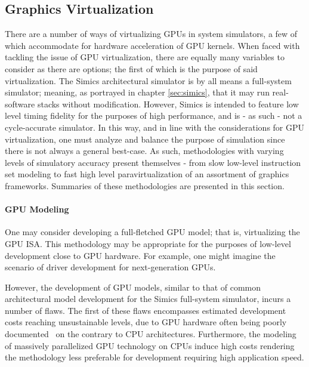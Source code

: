 \subsection{Graphics Virtualization}
\label{sec:backgroundandrelatedwork_graphicsvirtualization}
There are a number of ways of virtualizing GPUs in system simulators, a few of which accommodate for hardware acceleration of GPU kernels.
When faced with tackling the issue of GPU virtualization, there are equally many variables to consider as there are options; the first of which is the purpose of said virtualization.
The Simics architectural simulator is by all means a full-system simulator; meaning, as portrayed in chapter \ref{sec:simics}, that it may run real-software stacks without modification.
However, Simics is intended to feature low level timing fidelity for the purposes of high performance, and is - as such - not a cycle-accurate simulator.
In this way, and in line with the considerations for GPU virtualization, one must analyze and balance the purpose of simulation since there is not always a general best-case.
As such, methodologies with varying levels of simulatory accuracy present themselves - from slow low-level instruction set modeling to fast high level paravirtualization of an assortment of graphics frameworks.
Summaries of these methodologies are presented in this section.

\paragraph{GPU Modeling}
\label{par:backgroundandrelatedwork_graphicsvirtualization_gpumodeling}
One may consider developing a full-fletched GPU model; that is, virtualizing the GPU ISA.
This methodology may be appropriate for the purposes of low-level development close to GPU hardware.
For example, one might imagine the scenario of driver development for next-generation GPUs.

However, the development of GPU models, similar to that of common architectural model development for the Simics full-system simulator, incurs a number of flaws.
The first of these flaws encompasses estimated development costs reaching unsustainable levels, due to GPU hardware often being poorly documented~ on the contrary to CPU architectures.
Furthermore, the modeling of massively parallelized GPU technology on CPUs induce high costs rendering the methodology less preferable for development requiring high application speed.

